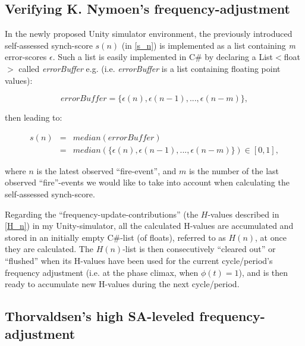 	
	\subsection{Verifying K. Nymoen's frequency-adjustment}
	
	In the newly proposed Unity simulator environment, the previously introduced self-assessed synch-score $s(n)$ (in \ref{s_n}) is implemented as a list containing \textit{m} error-scores $\epsilon$. Such a list is easily implemented in C\# by declaring a List$<$float$>$ called \textit{errorBuffer} e.g. (i.e. \textit{errorBuffer} is a list containing floating point values):
	
	\begin{equation}
	\label{error_buffer}
		errorBuffer = \{\epsilon(n), \epsilon(n-1), ... , \epsilon(n-m)\},
	\end{equation} \nl
	
	then leading to:
	
	\begin{equation}
	\label{self_assessed_synch}
		\begin{array}{rrclcl}
		s(n) & = & median(errorBuffer) \\ 
		& = & median(\{\epsilon(n), \epsilon(n-1), ... , \epsilon(n-m)\}) \in [0, 1],
		\end{array}
	\end{equation} \nl
	
	where $n$ is the latest observed ``fire-event'', and $m$ is the number of the last observed ``fire''-events we would like to take into account when calculating the self-assessed synch-score. \nl
	
	Regarding the ``frequency-update-contributions'' (the $H$-values described in \ref{H_n}) in my Unity-simulator, all the calculated H-values are accumulated and stored in an initially empty C\#-list (of floats), referred to as $H(n)$, at once they are calculated. The $H(n)$-list is then consecutively ``cleared out'' or ``flushed'' when its H-values have been used for the current cycle/period's frequency adjustment (i.e. at the phase climax, when $\phi(t)=1$), and is then ready to accumulate new H-values during the next cycle/period.
	
	
	\subsection{Thorvaldsen's high SA-leveled frequency-adjustment}
	
